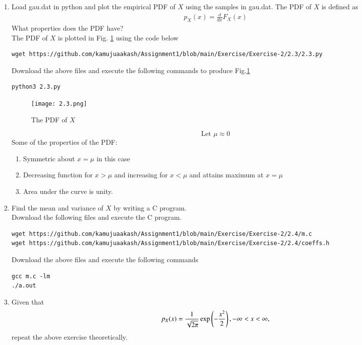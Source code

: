 \documentclass[journal,12pt,twocolumn]{IEEEtran}
\renewcommand\thesection{\arabic{section}}
\begin{document}
\begin{enumerate}[label=\thesection.\arabic*
,ref=\thesection.\theenumi]
     1) $$\lim_{x \to \infty}F_X(x) = 1$$\\
     2) $F_X(x)$ is non decreasing function.\\
     3) Symmetric about one point.

\item
Load gau.dat in python and plot the empirical PDF of $X$ using the samples in gau.dat. The PDF of $X$ is defined as
\begin{align}
p_{X}(x) = \frac{d}{dx}F_{X}(x)
\end{align}
What properties does the PDF have?
\\
\solution The PDF of $X$ is plotted in Fig. \ref{fig:2.3} using the code below
\begin{lstlisting}
wget https://github.com/kamujuaakash/Assignment1/blob/main/Exercise/Exercise-2/2.3/2.3.py
\end{lstlisting}
Download the above files and execute the following commands to produce Fig.\ref{fig:2.3}
\begin{lstlisting}
python3 2.3.py
\end{lstlisting}
\begin{figure}[!h]
\centering
\texttt{[image: 2.3.png]}
\caption{The PDF of $X$}
\label{fig:2.3}
\end{figure}
$$\text{Let }\mu \approx 0$$
Some of the properties of the PDF:
\begin{enumerate}
    \item Symmetric about $x=\mu$ in this case
    \item Decreasing function for $x>\mu$ and increasing for $x<\mu$ and attains maximum at $x=\mu$
    \item Area under the curve is unity.
\end{enumerate}
\item Find the mean and variance of $X$ by writing a C program.\\
\solution Download the following files and execute the  C program.
\begin{lstlisting}
wget https://github.com/kamujuaakash/Assignment1/blob/main/Exercise/Exercise-2/2.4/m.c
wget https://github.com/kamujuaakash/Assignment1/blob/main/Exercise/Exercise-2/2.4/coeffs.h
\end{lstlisting}
Download the above files and execute the following commands
\begin{lstlisting}
gcc m.c -lm
./a.out
\end{lstlisting}
\item Given that 
\begin{align}
p_{X}(x) = \frac{1}{\sqrt{2\pi}}\exp\left(-\frac{x^2}{2}\right), -\infty < x < \infty,
\end{align}
repeat the above exercise theoretically.
\end{enumerate}
\end{document}
